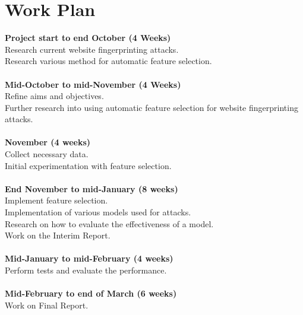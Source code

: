 \documentclass[10pt,a4paper]{article}
\begin{document}
\section{Work Plan}
  \textbf{Project start to end October (4 Weeks)}\\
  \indent Research current website fingerprinting attacks.\\
  \indent Research various method for automatic feature selection.\\
  \\
  \textbf{Mid-October to mid-November (4 Weeks)}\\
  \indent Refine aims and objectives.\\
  \indent Further research into using automatic feature selection for website fingerprinting attacks.\\
  \\
  \textbf{November (4 weeks)}\\
  \indent Collect necessary data.\\
  \indent Initial experimentation with feature selection.\\
  \\
  \textbf{End November to mid-January (8 weeks)}\\
  \indent Implement feature selection.\\
  \indent Implementation of various models used for attacks.\\
  \indent Research on how to evaluate the effectiveness of a model.\\
  \indent Work on the Interim Report.\\
  \\
  \textbf{Mid-January to mid-February (4 weeks)}\\
  \indent Perform tests and evaluate the performance.\\
  \\
  \textbf{Mid-February to end of March (6 weeks)}\\
  \indent Work on Final Report.\\
  \\
\end{document}
